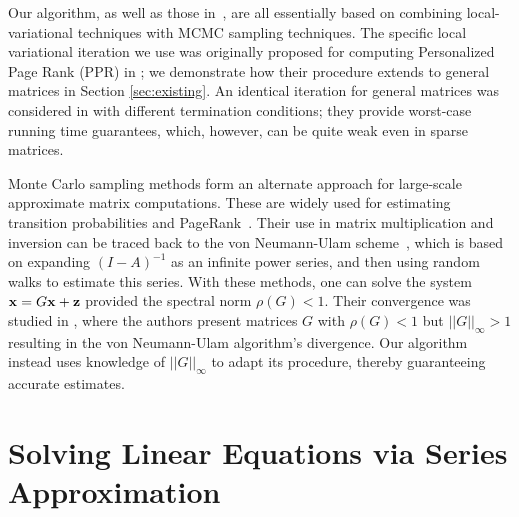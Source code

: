 Our algorithm, as well as those in~\cite{Lofgren2014,lofgren2016personalized,banerjee2015fast}, are all essentially based on combining local-variational techniques with MCMC sampling techniques.
The specific local variational iteration we use was originally proposed for computing Personalized Page Rank (PPR) in \cite{andersen2007local}; we demonstrate how their procedure extends to general matrices in Section \ref{sec:existing}. 
An identical iteration for general matrices was considered in \cite{lee2014asynchronous} with different termination conditions; they provide worst-case running time guarantees, which, however, can be quite weak even in sparse matrices. 


Monte Carlo sampling methods form an alternate approach for large-scale approximate matrix computations. 
These are widely used for estimating transition probabilities and PageRank~\cite{Avrachenkov2007}.
Their use in matrix multiplication and inversion can be traced back to the von Neumann-Ulam scheme~\cite{forsythe1950matrix}, which is based on expanding $(I-A)^{-1}$ as an infinite power series, and then using random walks to estimate this series. 
With these methods, one can solve the system $\mathbf{x} = G\mathbf{x} + \mathbf{z}$ provided the spectral norm $\rho(G) < 1$. 
Their convergence was studied in \cite{ji2013convergence}, where the authors present matrices $G$ with $\rho(G) < 1$ but  $||G||_\infty > 1$ resulting in the von Neumann-Ulam algorithm's divergence.  
Our algorithm instead uses knowledge of $||G||_{\infty}$ to adapt its procedure, thereby guaranteeing accurate estimates.




\section{Solving Linear Equations via Series Approximation}
\label{sec:linsolve}

